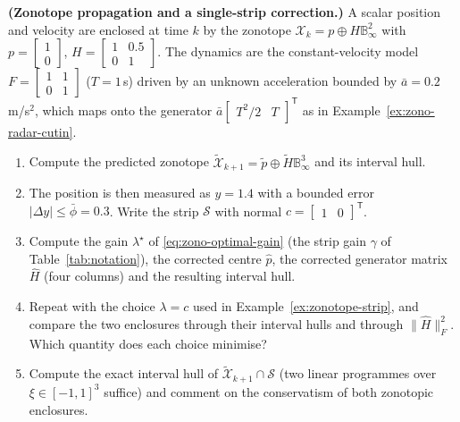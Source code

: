 \begin{prob}\label{prob:ch03:6}
\textbf{(Zonotope propagation and a single-strip correction.)} A scalar position and velocity are enclosed at time $k$ by the zonotope $\mathcal{X}_k=p\oplus H\mathbb{B}_{\infty}^{2}$ with
$p=\begin{bmatrix}1\\0\end{bmatrix}$, $H=\begin{bmatrix}1&0.5\\0&1\end{bmatrix}$.
The dynamics are the constant-velocity model $F=\begin{bmatrix}1&1\\0&1\end{bmatrix}$ ($T=1$\,s) driven by an unknown acceleration bounded by $\bar a=0.2$\,m/s$^{2}$, which maps onto the generator $\bar a\begin{bmatrix}T^{2}/2&T\end{bmatrix}^{\mathsf T}$ as in Example~\ref{ex:zono-radar-cutin}.
\begin{enumerate}
\item[(a)] Compute the predicted zonotope $\widetilde{\mathcal{X}}_{k+1}=\tilde p\oplus\tilde H\mathbb{B}_{\infty}^{3}$ and its interval hull.
\item[(b)] The position is then measured as $y=1.4$ with a bounded error $|\Delta y|\le\bar\phi=0.3$. Write the strip $\mathcal{S}$ with normal $c=\begin{bmatrix}1&0\end{bmatrix}^{\mathsf T}$.
\item[(c)] Compute the gain $\lambda^{\star}$ of \eqref{eq:zono-optimal-gain} (the strip gain $\gamma$ of Table~\ref{tab:notation}), the corrected centre $\hat p$, the corrected generator matrix $\hat H$ (four columns) and the resulting interval hull.
\item[(d)] Repeat with the choice $\lambda=c$ used in Example~\ref{ex:zonotope-strip}, and compare the two enclosures through their interval hulls and through $\|\hat H\|_{F}^{2}$. Which quantity does each choice minimise?
\item[(e)] Compute the exact interval hull of $\widetilde{\mathcal{X}}_{k+1}\cap\mathcal{S}$ (two linear programmes over $\xi\in[-1,1]^{3}$ suffice) and comment on the conservatism of both zonotopic enclosures.
\end{enumerate}
\end{prob}


